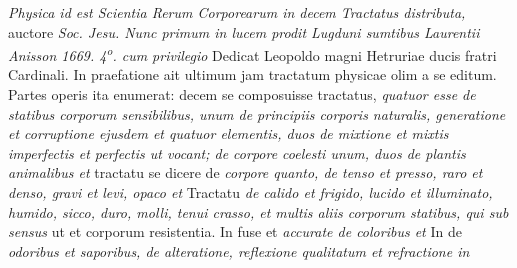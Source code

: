 %
\vspace*{8mm}
\pstart 
\normalsize
\noindent[152~v\textsuperscript{o}] 
\textit{Physica\protect{} id est Scientia Rerum Corporearum in decem Tractatus distributa,} auctore \protect{}\textit{Soc. Jesu. Nunc primum in lucem prodit Lugduni sumtibus Laurentii Anisson 1669. 4\textsuperscript{o}. cum privilegio}  Dedicat Leopoldo\protect{} magni Hetruriae ducis fratri Cardinali. In praefatione ait ultimum jam tractatum physicae olim a se editum. Partes operis ita enumerat: decem se composuisse tractatus, \textit{quatuor esse de statibus corporum sensibilibus, unum de principiis corporis naturalis, generatione et corruptione ejusdem et quatuor elementis, duos de mixtione et mixtis imperfectis et perfectis ut vocant; de corpore coelesti\protect{} unum, duos de plantis animalibus et}  tractatu se dicere de \textit{corpore quanto, de tenso et presso, raro et denso, gravi et levi, opaco et} 
Tractatu 
\textit{de calido et frigido, lucido et illuminato, humido, sicco, duro, molli, tenui crasso, et multis aliis corporum statibus\protect{}, qui sub sensus}  ut et corporum resistentia\protect{}. In  fuse et \textit{accurate de coloribus\protect{} et}  In  de \textit{odoribus\protect{} et saporibus\protect{}, de alteratione, reflexione qualitatum\protect{} et refractione in}
\textit{}
